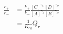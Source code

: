 \begin{eqnarray}
\frac{r_+}{r_-} & = \frac{k_+}{k_-}\frac{[C]^{\gamma_C}[D]^{\gamma_D}}{[A]^{\gamma_A}[B]^{\gamma_D}} \\
&  =  \frac{1}{K_{eq}}Q_r \\
\end{eqnarray}